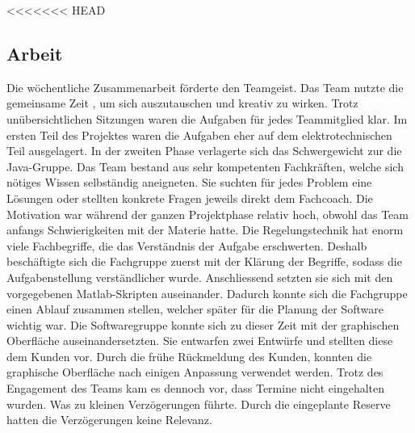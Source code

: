 <<<<<<< HEAD
\subsection{Arbeit}
Die wöchentliche Zusammenarbeit förderte den Teamgeist. Das Team nutzte die gemeinsame Zeit , um sich auszutauschen und kreativ zu wirken. Trotz unübersichtlichen Sitzungen waren die Aufgaben für jedes Teammitglied klar. Im ersten Teil des Projektes waren die Aufgaben eher auf dem elektrotechnischen Teil ausgelagert. In der zweiten Phase verlagerte sich das Schwergewicht zur die Java-Gruppe. Das Team bestand aus sehr kompetenten Fachkräften, welche sich nötiges Wissen selbständig aneigneten. Sie suchten für jedes Problem eine Lösungen oder stellten konkrete Fragen jeweils direkt dem Fachcoach. Die Motivation war während der ganzen Projektphase relativ hoch, obwohl das Team anfangs Schwierigkeiten mit der Materie hatte. 
Die Regelungstechnik hat enorm viele Fachbegriffe, die das Verständnis der Aufgabe erschwerten. Deshalb beschäftigte sich die Fachgruppe zuerst mit der Klärung der Begriffe, sodass die Aufgabenstellung verständlicher wurde. Anschliessend setzten sie sich mit den vorgegebenen Matlab-Skripten auseinander. Dadurch konnte sich die Fachgruppe einen Ablauf zusammen stellen, welcher später für die Planung der Software wichtig war. Die Softwaregruppe konnte sich zu dieser Zeit mit der graphischen Oberfläche auseinandersetzten. Sie entwarfen zwei Entwürfe und stellten diese dem Kunden vor. Durch die frühe Rückmeldung des Kunden, konnten die graphische Oberfläche nach einigen Anpassung  verwendet werden.
Trotz des Engagement des Teams kam es dennoch vor, dass Termine nicht eingehalten wurden. Was zu kleinen Verzögerungen führte. Durch die eingeplante Reserve hatten die Verzögerungen keine Relevanz. 
